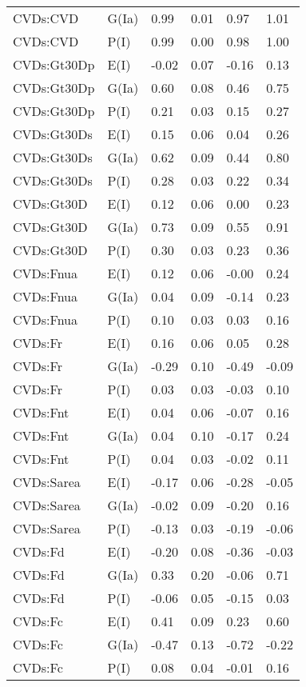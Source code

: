 \begin{center}
\begin{longtable}{|p{1.1in}|p{0.7in}|p{0.7in}|p{0.6in}|p{0.6in}|p{0.6in}|}
  CVDs:CVD & G(Ia) & 0.99 & 0.01 & 0.97 & 1.01 \\ 
  CVDs:CVD & P(I) & 0.99 & 0.00 & 0.98 & 1.00 \\ 
  CVDs:Gt30Dp & E(I) & -0.02 & 0.07 & -0.16 & 0.13 \\ 
  CVDs:Gt30Dp & G(Ia) & 0.60 & 0.08 & 0.46 & 0.75 \\ 
  CVDs:Gt30Dp & P(I) & 0.21 & 0.03 & 0.15 & 0.27 \\ 
  CVDs:Gt30Ds & E(I) & 0.15 & 0.06 & 0.04 & 0.26 \\ 
  CVDs:Gt30Ds & G(Ia) & 0.62 & 0.09 & 0.44 & 0.80 \\ 
  CVDs:Gt30Ds & P(I) & 0.28 & 0.03 & 0.22 & 0.34 \\ 
  CVDs:Gt30D & E(I) & 0.12 & 0.06 & 0.00 & 0.23 \\ 
  CVDs:Gt30D & G(Ia) & 0.73 & 0.09 & 0.55 & 0.91 \\ 
  CVDs:Gt30D & P(I) & 0.30 & 0.03 & 0.23 & 0.36 \\ 
  CVDs:Fnua & E(I) & 0.12 & 0.06 & -0.00 & 0.24 \\ 
  CVDs:Fnua & G(Ia) & 0.04 & 0.09 & -0.14 & 0.23 \\ 
  CVDs:Fnua & P(I) & 0.10 & 0.03 & 0.03 & 0.16 \\ 
  CVDs:Fr & E(I) & 0.16 & 0.06 & 0.05 & 0.28 \\ 
  CVDs:Fr & G(Ia) & -0.29 & 0.10 & -0.49 & -0.09 \\ 
  CVDs:Fr & P(I) & 0.03 & 0.03 & -0.03 & 0.10 \\ 
  CVDs:Fnt & E(I) & 0.04 & 0.06 & -0.07 & 0.16 \\ 
  CVDs:Fnt & G(Ia) & 0.04 & 0.10 & -0.17 & 0.24 \\ 
  CVDs:Fnt & P(I) & 0.04 & 0.03 & -0.02 & 0.11 \\ 
  CVDs:Sarea & E(I) & -0.17 & 0.06 & -0.28 & -0.05 \\ 
  CVDs:Sarea & G(Ia) & -0.02 & 0.09 & -0.20 & 0.16 \\ 
  CVDs:Sarea & P(I) & -0.13 & 0.03 & -0.19 & -0.06 \\ 
  CVDs:Fd & E(I) & -0.20 & 0.08 & -0.36 & -0.03 \\ 
  CVDs:Fd & G(Ia) & 0.33 & 0.20 & -0.06 & 0.71 \\ 
  CVDs:Fd & P(I) & -0.06 & 0.05 & -0.15 & 0.03 \\ 
  CVDs:Fc & E(I) & 0.41 & 0.09 & 0.23 & 0.60 \\ 
  CVDs:Fc & G(Ia) & -0.47 & 0.13 & -0.72 & -0.22 \\ 
  CVDs:Fc & P(I) & 0.08 & 0.04 & -0.01 & 0.16 \\ 

\end{longtable}
\end{center}
